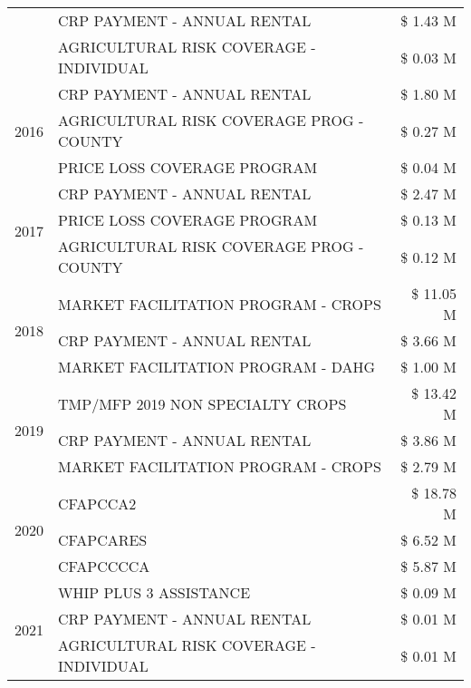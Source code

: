 \begin{tabular}{llr}
 & CRP PAYMENT - ANNUAL RENTAL & \$ 1.43 M \\
 & AGRICULTURAL RISK COVERAGE - INDIVIDUAL & \$ 0.03 M \\
\cline{1-3}
\multirow[t]{3}{*}{2016} & CRP PAYMENT - ANNUAL RENTAL & \$ 1.80 M \\
 & AGRICULTURAL RISK COVERAGE PROG - COUNTY & \$ 0.27 M \\
 & PRICE LOSS COVERAGE PROGRAM & \$ 0.04 M \\
\cline{1-3}
\multirow[t]{3}{*}{2017} & CRP PAYMENT - ANNUAL RENTAL & \$ 2.47 M \\
 & PRICE LOSS COVERAGE PROGRAM & \$ 0.13 M \\
 & AGRICULTURAL RISK COVERAGE PROG - COUNTY & \$ 0.12 M \\
\cline{1-3}
\multirow[t]{3}{*}{2018} & MARKET FACILITATION PROGRAM - CROPS & \$ 11.05 M \\
 & CRP PAYMENT - ANNUAL RENTAL & \$ 3.66 M \\
 & MARKET FACILITATION PROGRAM - DAHG & \$ 1.00 M \\
\cline{1-3}
\multirow[t]{3}{*}{2019} & TMP/MFP 2019 NON SPECIALTY CROPS & \$ 13.42 M \\
 & CRP PAYMENT - ANNUAL RENTAL & \$ 3.86 M \\
 & MARKET FACILITATION PROGRAM - CROPS & \$ 2.79 M \\
\cline{1-3}
\multirow[t]{3}{*}{2020} & CFAPCCA2 & \$ 18.78 M \\
 & CFAPCARES & \$ 6.52 M \\
 & CFAPCCCCA & \$ 5.87 M \\
\cline{1-3}
\multirow[t]{3}{*}{2021} & WHIP PLUS 3 ASSISTANCE & \$ 0.09 M \\
 & CRP PAYMENT - ANNUAL RENTAL & \$ 0.01 M \\
 & AGRICULTURAL RISK COVERAGE - INDIVIDUAL & \$ 0.01 M \\
\cline{1-3}
\bottomrule
\end{tabular}
